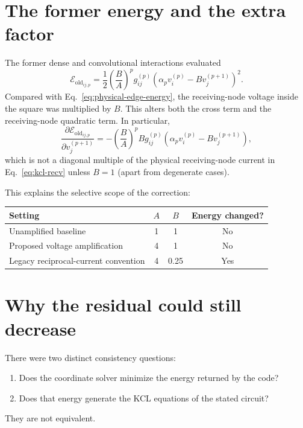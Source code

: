 \documentclass[11pt]{article}
\newcommand{\Eold}{\mathcal{E}_{\mathrm{old}}}
\begin{document}
\section{The former energy and the extra factor}

The former dense and convolutional interactions evaluated
\begin{equation}
  \Eold_{ij,p}
  =\frac{1}{2}\left(\frac{B}{A}\right)^p
   g_{ij}^{(p)}\left(\alpha_p v_i^{(p)}-Bv_j^{(p+1)}\right)^2.
  \label{eq:old-edge-energy}
\end{equation}
Compared with Eq.~\eqref{eq:physical-edge-energy}, the receiving-node voltage
inside the square was multiplied by $B$.  This alters both the cross term and
the receiving-node quadratic term.  In particular,
\begin{equation}
  \frac{\partial \Eold_{ij,p}}{\partial v_j^{(p+1)}}
  =-\left(\frac{B}{A}\right)^p
    B g_{ij}^{(p)}\left(\alpha_p v_i^{(p)}-Bv_j^{(p+1)}\right),
  \label{eq:old-gradient}
\end{equation}
which is not a diagonal multiple of the physical receiving-node current in
Eq.~\eqref{eq:kcl-recv} unless $B=1$ (apart from degenerate cases).

This explains the selective scope of the correction:
\begin{center}
\begin{tabular}{lccc}
\toprule
Setting & $A$ & $B$ & Energy changed?\\
\midrule
Unamplified baseline & 1 & 1 & No\\
Proposed voltage amplification & 4 & 1 & No\\
Legacy reciprocal-current convention & 4 & 0.25 & Yes\\
\bottomrule
\end{tabular}
\end{center}

\section{Why the residual could still decrease}

There were two distinct consistency questions:
\begin{enumerate}
  \item Does the coordinate solver minimize the energy returned by the code?
  \item Does that energy generate the KCL equations of the stated circuit?
\end{enumerate}
They are not equivalent.
\end{document}

